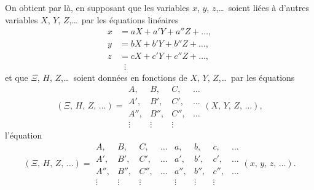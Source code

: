 \documentclass[11pt,a4paper]{article}
\theoremstyle{definition}
\begin{document}
On obtient par l\`a, en supposant que les variables $x$, $y$, $z$,\ldots\ soient
li\'ees \`a d'autres variables $X$, $Y$, $Z$,\ldots\ par les \'equations
lin\'eaires
\begin{align*}
x &= aX + a'Y + a''Z + \ldots, \\
y &= bX + b'Y + b''Z + \ldots, \\
z &= cX + c'Y + c''Z + \ldots, \\
& \;\;\vdots
\end{align*}
et que $\Xi$, $H$, $Z$,\ldots\ soient donn\'ees en fonctions de
$X$, $Y$, $Z$,\ldots\ par les \'equations
\[
(\Xi,\, H,\, Z,\, \ldots) =
\begin{array}{|cccc|}
A, & B, & C, & \ldots \\
A', & B', & C', & \ldots \\
A'', & B'', & C'', & \ldots \\
\vdots & \vdots & \vdots &
\end{array}
(X,\, Y,\, Z,\, \ldots),
\]
l'\'equation
\[
(\Xi,\, H,\, Z,\, \ldots) =
\begin{array}{|cccc|}
A, & B, & C, & \ldots \\
A', & B', & C', & \ldots \\
A'', & B'', & C'', & \ldots \\
\vdots & \vdots & \vdots &
\end{array}
\!
\begin{array}{|cccc|}
a, & b, & c, & \ldots \\
a', & b', & c', & \ldots \\
a'', & b'', & c'', & \ldots \\
\vdots & \vdots & \vdots &
\end{array}
(x,\, y,\, z,\, \ldots).
\]
\end{document}
